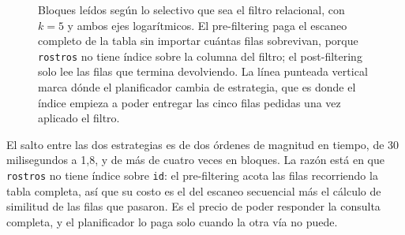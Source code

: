 \documentclass[a4paper,12pt]{article}
\begin{document}
\begin{figure}[H]
\centering
{}
\caption{Bloques leídos según lo selectivo que sea el filtro relacional, con
$k = 5$ y ambos ejes logarítmicos. El pre-filtering paga el escaneo completo de
la tabla sin importar cuántas filas sobrevivan, porque \texttt{rostros} no tiene
índice sobre la columna del filtro; el post-filtering solo lee las filas que
termina devolviendo. La línea punteada vertical marca dónde el planificador
cambia de estrategia, que es donde el índice empieza a poder entregar las cinco
filas pedidas una vez aplicado el filtro.}
\label{fig:e9-estrategia}
\end{figure}

El salto entre las dos estrategias es de dos órdenes de magnitud en tiempo, de
30 milisegundos a 1{,}8, y de más de cuatro veces en bloques. La razón está en
que \texttt{rostros} no tiene índice sobre \texttt{id}: el pre-filtering acota
las filas recorriendo la tabla completa, así que su costo es el del escaneo
secuencial más el cálculo de similitud de las filas que pasaron. Es el precio de
poder responder la consulta completa, y el planificador lo paga solo cuando la
otra vía no puede.
\end{document}
